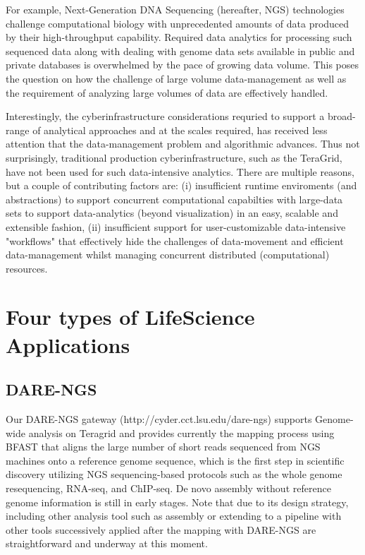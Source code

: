 \documentclass[12pt]{article}
\begin{document}
For example, Next-Generation DNA Sequencing (hereafter, NGS) technologies challenge computational biology with unprecedented
amounts of data produced by their high-throughput capability.  Required data analytics for processing such sequenced data along with dealing with genome data sets available in public and private databases is overwhelmed by the pace of growing data volume.  This poses the question on how the challenge of large volume data-management as well as the requirement of analyzing large volumes of data are effectively handled.  

Interestingly, the cyberinfrastructure considerations requried to
support a broad-range of analytical approaches and at the scales
required, has received less attention that the data-management problem
and algorithmic advances.  Thus not surprisingly, traditional
production cyberinfrastructure, such as the TeraGrid, have not been
used for such data-intensive analytics. There are multiple reasons,
but a couple of contributing factors are: (i) insufficient runtime
enviroments (and abstractions) to support concurrent computational
capabilties with large-data sets to support data-analytics (beyond
visualization) in an easy, scalable and extensible fashion, (ii)
insufficient support for user-customizable data-intensive "workflows"
that effectively hide the challenges of data-movement and efficient
data-management whilst managing concurrent distributed (computational)
resources.







\section{Four types of LifeScience Applications}

\subsection{DARE-NGS}
Our DARE-NGS gateway (http://cyder.cct.lsu.edu/dare-ngs) supports Genome-wide analysis on Teragrid and provides currently the mapping process using BFAST that aligns the large number of short reads sequenced from NGS machines onto a reference genome sequence, which is the first step in scientific discovery utilizing NGS sequencing-based protocols such as the whole genome resequencing, RNA-seq, and ChIP-seq.  De novo assembly without reference genome information is still in early stages.  Note that due to its design strategy, including other analysis tool such as assembly or extending to a pipeline with other tools successively applied after the mapping with DARE-NGS are straightforward and underway at this moment.
\end{document}
